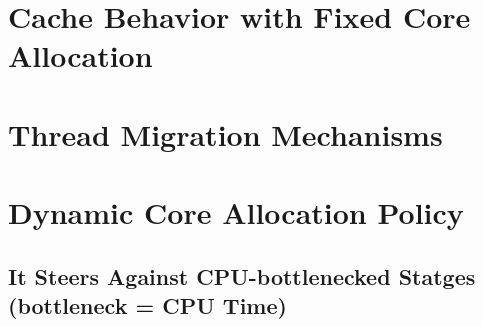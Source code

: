\documentclass[12pt,a4paper]{book}
\begin{document}
\section{Cache Behavior with Fixed Core Allocation}\label{ch:eval:fixed}

\section{Thread Migration Mechanisms}\label{ch:eval:mig}

\section{Dynamic Core Allocation Policy}\label{ch:eval:pol}

\subsection{It Steers Against CPU-bottlenecked Statges (bottleneck = CPU Time)}
\end{document}

